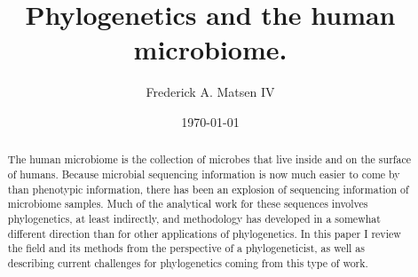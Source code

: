 \documentclass{amsart}
\newcommand{\forarxiv}[1]{#1}
\newcommand{\notforarxiv}[1]{}
\begin{document}
\notforarxiv{
\begin{flushright}
Version dated: \today
\end{flushright}
\bigskip
\noindent RH: PHYLOGENETICS AND THE HUMAN MICROBIOME
\bigskip
\medskip
\begin{center}

\noindent{\Large \bf Phylogenetics and the human microbiome.}
\bigskip

\noindent {\normalsize \sc
Frederick A. Matsen IV$^1$}\\
\noindent {\small \it
$^1$
Program in Computational Biology, Fred Hutchinson Cancer Research Center, Seattle, WA, 91802, USA}\\
\end{center}
\medskip
\noindent{\bf Corresponding author:} Frederick A Matsen, Program in Computational Biology, Fred Hutchinson Cancer Research Center, Seattle, WA, 91802, USA; E-mail: matsen@fhcrc.org.\\
\vspace{1in}
}

\forarxiv{\
\title{Phylogenetics and the human microbiome.}
\author{Frederick A. Matsen IV}
\date{\today}
\begin{abstract}
}
\notforarxiv{
\subsubsection{Abstract}
}

The human microbiome is the collection of microbes that live inside and on the surface of humans.
Because microbial sequencing information is now much easier to come by than phenotypic information, there has been an explosion of sequencing information of microbiome samples.
Much of the analytical work for these sequences involves phylogenetics, at least indirectly, and methodology has developed in a somewhat different direction than for other applications of phylogenetics.
In this paper I review the field and its methods from the perspective of a phylogeneticist, as well as describing current challenges for phylogenetics coming from this type of work.

\forarxiv{
\end{abstract}
\maketitle
}

\notforarxiv{
\noindent (Keywords: human microbiome; microbial ecology; phylogenetic methods; review)\\
\vspace{1.5in}
}
\end{document}
